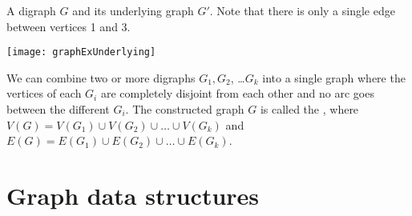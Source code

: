\begin{Example}
A digraph $G$ and its underlying graph $G'$.
Note that there is only a single edge between vertices 1 and 3.
\begin{center}
\texttt{[image: graphExUnderlying]}
\end{center}
\end{Example}

\begin{Definition} 
We can combine two or more digraphs $G_1, G_2$, \ldots $G_k$ into a
single graph where the vertices of each $G_i$ are completely disjoint from
each other and no arc goes between the different $G_i$. The constructed
graph $G$ is called the , where $V(G) = V(G_1) \cup
V(G_2) \cup \ldots \cup V(G_k)$ and $E(G) = E(G_1) \cup E(G_2) \cup \ldots
\cup E(G_k)$.
\end{Definition}




%
%
%
%




 

\chapter{Graph data structures} \label{sec:graph-reps} %

